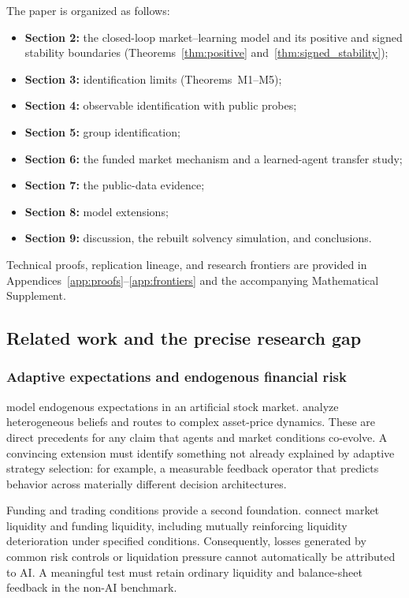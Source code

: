 \documentclass[10pt,twocolumn,letterpaper]{article}
\theoremstyle{definition}
\theoremstyle{remark}
\begin{document}
The paper is organized as follows:
\begin{itemize}[leftmargin=*]
 \item \textbf{Section 2:} the closed-loop market--learning model and its positive and signed stability boundaries (Theorems~\ref{thm:positive} and~\ref{thm:signed_stability});
 \item \textbf{Section 3:} identification limits (Theorems~M1--M5);
 \item \textbf{Section 4:} observable identification with public probes;
 \item \textbf{Section 5:} group identification;
 \item \textbf{Section 6:} the funded market mechanism and a learned-agent transfer study;
 \item \textbf{Section 7:} the public-data evidence;
 \item \textbf{Section 8:} model extensions;
 \item \textbf{Section 9:} discussion, the rebuilt solvency simulation, and conclusions.
\end{itemize}
Technical proofs, replication lineage, and research frontiers are provided in Appendices~\ref{app:proofs}--\ref{app:frontiers} and the accompanying Mathematical Supplement.

\subsection{Related work and the precise research gap}
\label{sec:related}
\subsubsection{Adaptive expectations and endogenous financial risk}
\citet{arthur1996} model endogenous expectations in an artificial stock market. \citet{brock1998} analyze heterogeneous beliefs and routes to complex asset-price dynamics. These are direct precedents for any claim that agents and market conditions co-evolve. A convincing extension must identify something not already explained by adaptive strategy selection: for example, a measurable feedback operator that predicts behavior across materially different decision architectures.

Funding and trading conditions provide a second foundation. \citet{brunnermeier2009} connect market liquidity and funding liquidity, including mutually reinforcing liquidity deterioration under specified conditions. Consequently, losses generated by common risk controls or liquidation pressure cannot automatically be attributed to AI. A meaningful test must retain ordinary liquidity and balance-sheet feedback in the non-AI benchmark.
\end{document}
